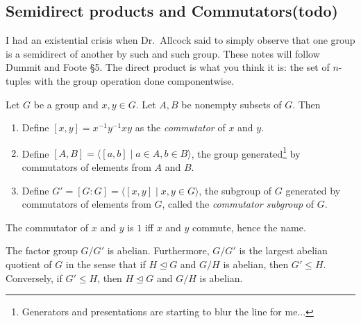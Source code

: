 \subsection{Semidirect products and Commutators(todo)}
I had an existential crisis when Dr.\ Allcock said to simply observe that one group is a semidirect of another by such and such group. These notes will follow Dummit and Foote \S 5.
\orbreak
The direct product is what you think it is: the set of $n$-tuples with the group operation done componentwise.

\begin{definition}[Commutators]
    Let $G$ be a group and $x,y\in G$. Let $A,B$ be nonempty subsets of $G$. Then 
    \begin{enumerate}
        \item Define $[x,y]=x^{-1}y^{-1}xy$ as the \emph{commutator} of $x$ and $y$.
        \item Define $[A,B]=\langle [a,b] \mid a\in A,b\in B \rangle $, the group generated\footnote{Generators and presentations are starting to blur the line for me...} by commutators of elements from $A$ and $B$.
        \item Define $G'=[G:G]=\langle [x,y] \mid x,y\in G \rangle $, the subgroup of $G$ generated by commutators of elements from $G$, called the \emph{commutator subgroup} of $G$.
    \end{enumerate}
\end{definition}
The commutator of $x$ and $y$ is $1$ iff $x$ and $y$ commute, hence the name.
\begin{prop}
    The factor group $G /G'$ is abelian. Furthermore, $G /G'$ is the largest abelian quotient of $G$ in the sense that if $H \trianglelefteq G$ and $G /H$ is abelian, then $G'\leq H$. Conversely, if $G' \leq H$, then $H \trianglelefteq G$ and $G /H$ is abelian.
\end{prop}

